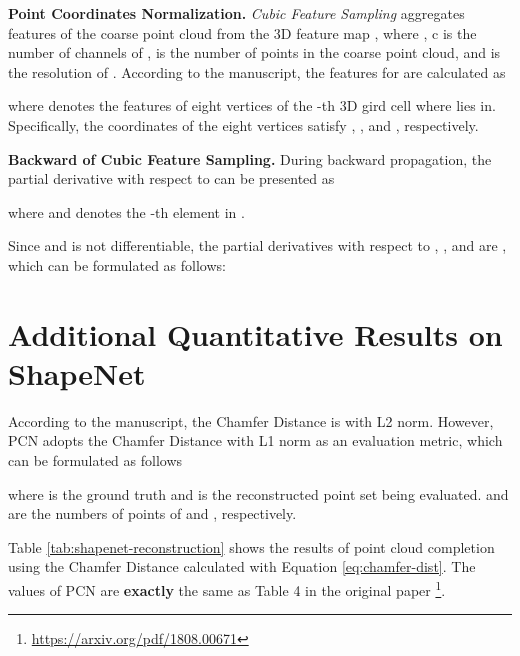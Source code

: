 \documentclass[runningheads]{llncs}
\begin{document}
\noindent \textbf{Point Coordinates Normalization.}
{\it Cubic Feature Sampling} aggregates features  of the coarse point cloud  from the 3D feature map , where , c is the number of channels of ,  is the number of points in the coarse point cloud, and  is the resolution of .
According to the manuscript, the features  for  are calculated as


where  denotes the features of eight vertices of the -th 3D gird cell where  lies in.
Specifically, the coordinates of the eight vertices  satisfy 
, 
, 
and , respectively.

\noindent \textbf{Backward of Cubic Feature Sampling.}
During backward propagation, the partial derivative with respect to  can be presented as


where  and  denotes the -th element in .

Since  and  is not differentiable, the partial derivatives with respect to , , and  are  \cite{DBLP:conf/iclr/EsserJDRD20}, which can be formulated as follows:







\section{Additional Quantitative Results on ShapeNet}
\label{sec:shapenet-quantitative-results}

According to the manuscript, the Chamfer Distance is with L2 norm.
However, PCN \cite{DBLP:conf/ThreeDim/YuanKHMH18} adopts the Chamfer Distance with L1 norm as an evaluation metric, which can be formulated as follows


where  is the ground truth and  is the reconstructed point set being evaluated.
 and  are the numbers of points of  and , respectively.

Table \ref{tab:shapenet-reconstruction} shows the results of point cloud completion using the Chamfer Distance calculated with Equation \ref{eq:chamfer-dist}.
The values of PCN are \textbf{exactly} the same as Table 4 in the original paper \footnote{\url{https://arxiv.org/pdf/1808.00671}}.
\end{document}
